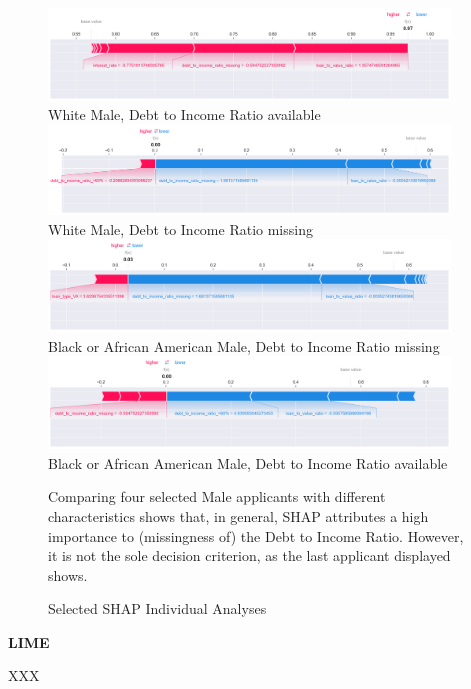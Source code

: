 \begin{figure}[h]
    \centering
    \includegraphics[width=0.95\textwidth]{images/SHAP_Individual_Analyses/SHAP_individual_0.png}
    \small
    White Male, Debt to Income Ratio available
    \includegraphics[width=0.95\textwidth]{images/SHAP_Individual_Analyses/SHAP_individual_1.png}
    \small
    White Male, Debt to Income Ratio missing
    \includegraphics[width=0.95\textwidth]{images/SHAP_Individual_Analyses/SHAP_individual_21.png}
    \small
    Black or African American Male, Debt to Income Ratio missing
    \includegraphics[width=0.95\textwidth]{images/SHAP_Individual_Analyses/SHAP_individual_139.png}
    \small
    Black or African American Male, Debt to Income Ratio available
    \caption{Selected SHAP Individual Analyses}
    \medskip
    \small
    Comparing four selected Male applicants with different characteristics shows that, in general, SHAP attributes a high importance to (missingness of) the Debt to Income Ratio. However, it is not the sole decision criterion, as the last applicant displayed shows.
    \label{fig:SHAP_Individual_Analyses}
\end{figure}

\textbf{LIME}

XXX

